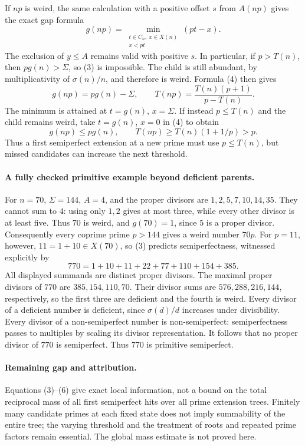 If \(np\) is weird, the same calculation with a positive offset
\(s\) from \(A(np)\) gives the exact gap formula
\[
 g(np)=\min_{\substack{t\in C_n,\ x\in X(n)\\x<pt}}(pt-x).
 \tag{4}
\]
The exclusion of \(y\leq A\) remains valid with positive \(s\).
In particular, if \(p>T(n)\), then \(pg(n)>\Sigma\), so (3)
is impossible. The child is still abundant, by multiplicativity
of \(\sigma(n)/n\), and therefore is weird. Formula (4) then gives
\[
 g(np)=pg(n)-\Sigma,\qquad
 T(np)=\frac{T(n)(p+1)}{p-T(n)}.
 \tag{5}
\]
The minimum is attained at \(t=g(n)\), \(x=\Sigma\).
If instead \(p\leq T(n)\) and the child remains weird, take
\(t=g(n)\), \(x=0\) in (4) to obtain
\[
 g(np)\leq pg(n),\qquad
 T(np)\geq T(n)(1+1/p)>p.
 \tag{6}
\]
Thus a first semiperfect extension at a new prime must use
\(p\leq T(n)\), but missed candidates can increase the next threshold.

\paragraph{A fully checked primitive example beyond deficient parents.}
For \(n=70\), \(\Sigma=144\), \(A=4\), and the proper divisors are
\(1,2,5,7,10,14,35\). They cannot sum to \(4\): using only
\(1,2\) gives at most three, while every other divisor is at least five.
Thus \(70\) is weird, and \(g(70)=1\), since \(5\) is a proper divisor.
Consequently every coprime prime \(p>144\) gives a weird number \(70p\).
For \(p=11\), however, \(11=1+10\in X(70)\), so (3) predicts
semiperfectness, witnessed explicitly by
\[
 770=1+10+11+22+77+110+154+385.
\]
All displayed summands are distinct proper divisors.
The maximal proper divisors of \(770\) are \(385,154,110,70\).
Their divisor sums are \(576,288,216,144\), respectively, so the
first three are deficient and the fourth is weird.
Every divisor of a deficient number is deficient, since
\(\sigma(d)/d\) increases under divisibility.
Every divisor of a non-semiperfect number is non-semiperfect:
semiperfectness passes to multiples by scaling its divisor representation.
It follows that no proper divisor of \(770\) is semiperfect.
Thus \(770\) is primitive semiperfect.

\paragraph{Remaining gap and attribution.}
Equations (3)--(6) give exact local information, not a bound on the
total reciprocal mass of all first semiperfect hits over all prime
extension trees. Finitely many candidate primes at each fixed state
does not imply summability of the entire tree; the varying threshold
and the treatment of roots and repeated prime factors remain essential.
The global mass estimate is not proved here.

